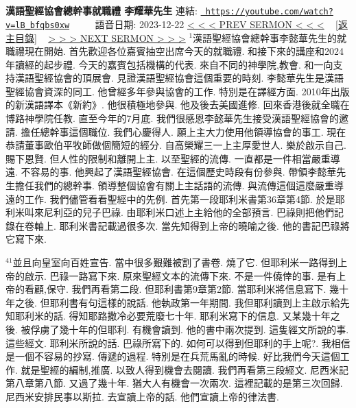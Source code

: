 \documentclass{book}
\begin{document}
\section{}
\label{sec:lB_bfqbs0xw}
\textbf{漢語聖經協會總幹事就職禮 李耀華先生}
\newline
\newline
連結: \href{https://youtube.com/watch?v=lB_bfqbs0xw}{\texttt{ https://youtube.com/watch?v=lB\_bfqbs0xw}} ~~~~ 語音日期: 2023-12-22 
\newline
\newline
\hyperref[sec:h6V3lBcFI1I]{\small{< < < PREV SERMON < < <}}
~
\hyperref[sec:index]{\small{[返主目錄]}}
~
\hyperref[sec:uvYtXSSsYt0]{\small{> > > NEXT SERMON > > >}}
\newline
\newline
$^{1}$漢語聖經協會總幹事李懿華先生的就職禮現在開始.
首先歡迎各位嘉賓抽空出席今天的就職禮.
和接下來的講座和2024年讀經的起步禮.
今天的嘉賓包括機構的代表.
來自不同的神學院,教會.
和一向支持漢語聖經協會的頂展會.
見證漢語聖經協會這個重要的時刻.
李懿華先生是漢語聖經協會資深的同工.
他曾經多年參與協會的工作.
特別是在譯經方面.
2010年出版的新漢語譯本《新約》.
他很積極地參與.
他及後去美國進修.
回來香港後就全職在博路神學院任教.
直至今年的7月底.
我們很感恩李懿華先生接受漢語聖經協會的邀請.
擔任總幹事這個職位.
我們心慶得人.
願上主大力使用他領導協會的事工.
現在恭請董事歐伯平牧師做個簡短的經分.
自高榮耀三一上主厚愛世人.
樂於啟示自己.
賜下恩賢.
但人性的限制和離開上主.
以至聖經的流傳.
一直都是一件相當嚴重導遠.
不容易的事.
他興起了漢語聖經協會.
在這個歷史時段有份參與.
帶領李懿華先生擔任我們的總幹事.
領導整個協會有關上主話語的流傳.
與流傳這個這麼嚴重導遠的工作.
我們儘管看看聖經中的先例.
首先第一段耶利米書第36章第4節.
於是耶利米叫來尼利亞的兒子巴祿.
由耶利米口述上主給他的全部預言.
巴祿則把他們記錄在卷軸上.
耶利米書記載過很多次.
當先知得到上帝的曉喻之後.
他的書記巴祿將它寫下來.

$^{41}$並且向皇室向百姓宣告.
當中很多艱難被割了書卷.
燒了它.
但耶利米一路得到上帝的啟示.
巴祿一路寫下來.
原來聖經文本的流傳下來.
不是一件僥倖的事.
是有上帝的看顧,保守.
我們再看第二段.
但耶利書第9章第2節.
當耶利米將信息寫下.
幾十年之後.
但耶利書有句這樣的說話.
他執政第一年期間.
我但耶利讀到上主啟示給先知耶利米的話.
得知耶路撒冷必要荒廢七十年.
耶利米寫下的信息.
又某幾十年之後.
被俘虜了幾十年的但耶利.
有機會讀到.
他的書中兩次提到.
這隻經文所說的事.
這些經文.
耶利米所說的話.
巴祿所寫下的.
如何可以得到但耶利的手上呢?.
我相信是一個不容易的抄寫.
傳遞的過程.
特別是在兵荒馬亂的時候.
好比我們今天這個工作.
就是聖經的編制,推廣.
以致人得到機會去閱讀.
我們再看第三段經文.
尼西米記第八章第八節.
又過了幾十年.
猶大人有機會一次兩次.
這裡記載的是第三次回歸.
尼西米安排民事以斯拉.
去宣讀上帝的話.
他們宣讀上帝的律法書.
\end{document}
